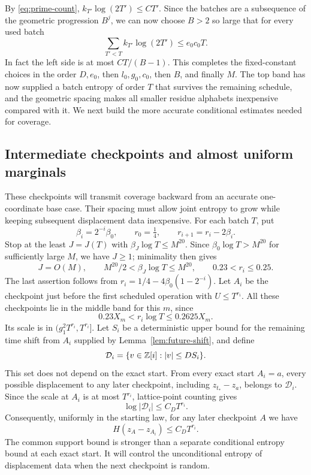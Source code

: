 By \eqref{eq:prime-count}, \(k_{T'}\log(2T')\le C T'\).
Since the batches are a subsequence of the geometric progression
\(B^j\), we can now choose \(B>2\) so large that for every used batch
\begin{equation}\label{eq:smaller-alphabet}
\sum_{T'<T}k_{T'}\log(2T')\le e_0c_0T.
\end{equation}
In fact the left side is at most \(CT/(B-1)\).
This completes the fixed-constant choices in the order
\(D,e_0\), then \(l_0,g_0,c_0\), then \(B\), and finally \(M\).
The top band has now supplied a batch entropy of order \(T\) that
survives the remaining schedule, and the geometric spacing makes all
smaller residue alphabets inexpensive compared with it. We next build
the more accurate conditional estimates needed for coverage.

\subsection{Intermediate checkpoints and almost uniform marginals}

These checkpoints will transmit coverage backward from an accurate
one-coordinate base case. Their spacing must allow joint entropy to
grow while keeping subsequent displacement data inexpensive.
For each batch \(T\), put
\begin{equation}\label{eq:checkpoint-parameters}
\beta_i=2^{-i}\beta_0,\qquad r_0=\tfrac14,\qquad
r_{i+1}=r_i-2\beta_i.
\end{equation}
Stop at the least \(J=J(T)\) with \(\beta_J\log T\le M^{20}\).
Since \(\beta_0\log T>M^{20}\) for sufficiently large \(M\), we have
\(J\ge1\); minimality then gives
\begin{equation}\label{eq:checkpoint-ranges}
J=O(M),\qquad
M^{20}/2<\beta_J\log T\le M^{20},\qquad
0.23<r_i\le0.25.
\end{equation}
The last assertion follows from
\(r_i=1/4-4\beta_0(1-2^{-i})\).
Let \(A_i\) be the checkpoint just before the first scheduled operation
with \(U\le T^{r_i}\).
All these checkpoints lie in the middle band for this \(m\), since
\[
0.23X_m<r_i\log T\le0.2625X_m.
\]
Its scale is in \((g_1^2T^{r_i},T^{r_i}]\).
Let \(S_i\) be a deterministic upper bound for the remaining time
shift from \(A_i\) supplied by Lemma~\ref{lem:future-shift}, and define
\[
 \mathcal D_i=\{v\in\mathbb Z[i]:|v|\le DS_i\}.
\]
This set does not depend on the exact start. From every exact start
\(A_i=a\), every possible displacement to any later checkpoint,
including \(z_{t_*}-z_a\), belongs to \(\mathcal D_i\). Since the scale
at \(A_i\) is at most \(T^{r_i}\), lattice-point counting gives
\begin{equation}\label{eq:native-data}
 \log|\mathcal D_i|\le C_D T^{r_i}.
\end{equation}
Consequently, uniformly in the starting law, for any later checkpoint
\(A\) we have
\begin{equation}\label{eq:checkpoint-displacement}
 H(z_A-z_{A_i})\le C_D T^{r_i}.
\end{equation}
The common support bound is stronger than a separate conditional entropy
bound at each exact start. It will control the unconditional entropy
of displacement data when the next checkpoint is random.

